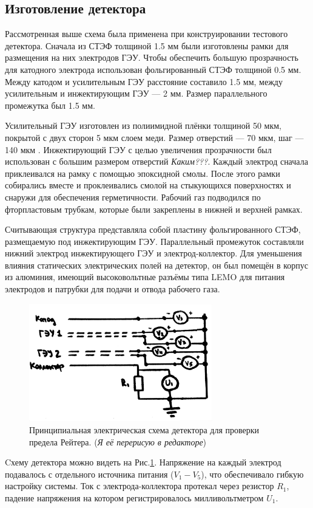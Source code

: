 \subsection{Изготовление детектора}
Рассмотренная выше схема была применена при конструировании тестового детектора. Сначала из СТЭФ толщиной 1.5 мм были изготовлены рамки для размещения на них электродов ГЭУ. Чтобы обеспечить большую прозрачность для катодного электрода использован фольгированный СТЭФ толщиной 0.5 мм. Между катодом и усилительным ГЭУ расстояние составило 1.5 мм, между усилительным и инжектирующим ГЭУ --- 2 мм. Размер параллельного промежутка был 1.5 мм.
\par Усилительный ГЭУ изготовлен из полиимидной плёнки толщиной 50 мкм, покрытой с двух сторон 5 мкм слоем меди. Размер отверстий --- 70 мкм, шаг --- 140 мкм \cite{sauli}. Инжектирующий ГЭУ с целью увеличения прозрачности был использован с большим размером отверстий \textit{Каким???}. Каждый электрод сначала приклеивался на рамку с помощью эпоксидной смолы. После этого рамки собирались вместе и проклеивались смолой на стыкующихся поверхностях и снаружи для обеспечения герметичности. Рабочий газ подводился по фторпластовым трубкам, которые были закреплены в нижней и верхней рамках.
\par Считывающая структура представляла собой пластину фольгированного СТЭФ, размещаемую под инжектирующим ГЭУ. Параллельный промежуток составляли нижний электрод инжектирующего ГЭУ и электрод-коллектор. Для уменьшения влияния статических электрических полей на детектор, он был помещён в корпус из алюминия, имеющий высоковольтные разъёмы типа LEMO для питания электродов и патрубки для подачи и отвода рабочего газа.  
\begin{figure}[H]
	\begin{center}
		\includegraphics[width = 8cm]{img/Scheme_raether_det.pdf}
		\caption{Принципиальная электрическая схема детектора для проверки предела Рейтера. (\textit{Я её перерисую в редакторе})}
		\label{el_scheme_raether}
	\end{center}
\end{figure}
\noindent
\par Cхему детектора можно видеть на Рис.\ref{el_scheme_raether}. Напряжение на каждый электрод подавалось с отдельного источника питания ($V_1-V_5$), что обеспечивало гибкую настройку системы.
Ток с электрода-коллектора протекал через резистор $R_1$, падение напряжения на котором регистрировалось милливольтметром $U_1$. 
